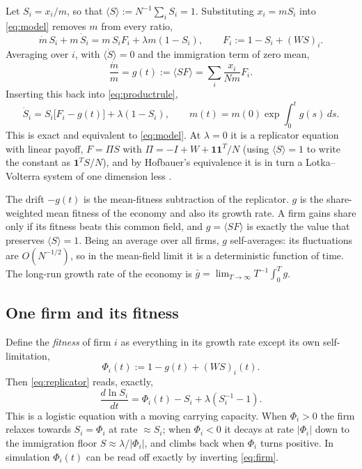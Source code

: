 \documentclass[11pt]{article}
\begin{document}
Let $S_i=x_i/m$, so that $\langle S\rangle:=N^{-1}\sum_iS_i=1$.  Substituting $x_i=mS_i$ into
\eqref{eq:model} removes $m$ from every ratio,
\begin{equation}
  \dot m\,S_i+m\,\dot S_i=m\,S_iF_i+\lambda m(1-S_i),\qquad F_i:=1-S_i+(WS)_i .
  \label{eq:productrule}
\end{equation}
Averaging over $i$, with $\langle\dot S\rangle=0$ and the immigration term of zero mean,
\begin{equation}
  \frac{\dot m}{m}=g(t):=\langle SF\rangle=\sum_i\frac{x_i}{Nm}F_i .
  \label{eq:g}
\end{equation}
Inserting this back into \eqref{eq:productrule},
\begin{equation}
  \boxed{\;\dot S_i=S_i\bigl[F_i-g(t)\bigr]+\lambda(1-S_i),\qquad
  m(t)=m(0)\exp\!\int_0^tg(s)\,ds .\;}
  \label{eq:replicator}
\end{equation}
This is exact and equivalent to \eqref{eq:model}.  At $\lambda=0$ it is a replicator equation
with linear payoff, $F=\Pi S$ with $\Pi=-I+W+\mathbf 1\mathbf 1^T/N$ (using $\langle S\rangle=1$ to write
the constant as $\mathbf 1^TS/N$), and by Hofbauer's equivalence it is in turn a Lotka--Volterra
system of one dimension less \citep{hofbauer81}.

The drift $-g(t)$ is the mean-fitness subtraction of the replicator.  $g$ is the share-weighted
mean fitness of the economy and also its growth rate.  A firm gains share only if its fitness
beats this common field, and $g=\langle SF\rangle$ is exactly the value that preserves
$\langle S\rangle=1$.  Being an average over all firms, $g$ self-averages: its fluctuations are
$O(N^{-1/2})$, so in the mean-field limit it is a deterministic function of time.  The long-run
growth rate of the economy is $\bar g=\lim_{T\to\infty}T^{-1}\int_0^Tg$.

\subsection{One firm and its fitness}
\label{sec:firm}

Define the \emph{fitness} of firm $i$ as everything in its growth rate except its own
self-limitation,
\begin{equation}
  \Phi_i(t):=1-g(t)+(WS)_i(t).
\end{equation}
Then \eqref{eq:replicator} reads, exactly,
\begin{equation}
  \boxed{\;\frac{d\ln S_i}{dt}=\Phi_i(t)-S_i+\lambda\left(S_i^{-1}-1\right).\;}
  \label{eq:firm}
\end{equation}
This is a logistic equation with a moving carrying capacity.  When $\Phi_i>0$ the firm relaxes
towards $S_i=\Phi_i$ at rate $\approx S_i$; when $\Phi_i<0$ it decays at rate $|\Phi_i|$ down to the
immigration floor $S\approx\lambda/|\Phi_i|$, and climbs back when $\Phi_i$ turns positive.  In
simulation $\Phi_i(t)$ can be read off exactly by inverting \eqref{eq:firm}.
\end{document}

